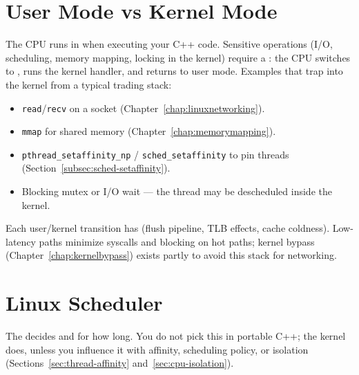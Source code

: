 \section{User Mode vs Kernel Mode}
\label{sec:user-kernel-mode}
The CPU runs in  when executing your C++ code. 
Sensitive operations (I/O, scheduling, memory mapping, locking in the kernel) require a 
: the CPU switches to , runs the kernel handler, 
and returns to user mode.
\newline
Examples that trap into the kernel from a typical trading stack:
\begin{itemize}
    \item \texttt{read}/\texttt{recv} on a socket (Chapter~\ref{chap:linuxnetworking}).
    \item \texttt{mmap} for shared memory (Chapter~\ref{chap:memorymapping}).
    \item \texttt{pthread\_setaffinity\_np} / \texttt{sched\_setaffinity} to pin threads (Section~\ref{subsec:sched-setaffinity}).
    \item Blocking mutex or I/O wait --- the thread may be descheduled inside the kernel.
\end{itemize}
Each user/kernel transition has  (flush pipeline, TLB effects, cache coldness). 
Low-latency paths minimize syscalls and blocking on hot paths; kernel bypass (Chapter~\ref{chap:kernelbypass}) 
exists partly to avoid this stack for networking.

\section{Linux Scheduler}
\label{sec:linux-scheduler}
The  decides  and for how long. 
You do not pick this in portable C++; the kernel does, unless you influence it with affinity, 
scheduling policy, or isolation (Sections~\ref{sec:thread-affinity} and~\ref{sec:cpu-isolation}).

